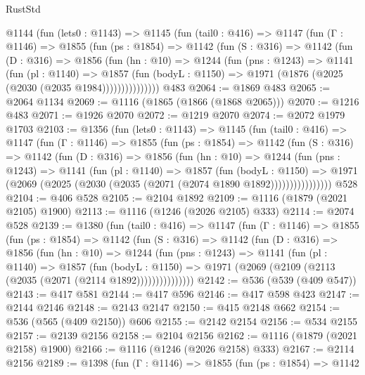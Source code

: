 \begin{lexlean}{RustStd}
\begin{coremodule}
    @1144
      (fun (lets0 : @1143) =>
      @1145
        (fun (tail0 : @416) =>
        @1147
          (fun (Γ : @1146) =>
          @1855
            (fun (ps : @1854) =>
            @1142
              (fun (S : @316) =>
              @1142
                (fun (D : @316) =>
                @1856
                  (fun (hn : @10) =>
                  @1244
                    (fun (pns : @1243) =>
                    @1141
                      (fun (pl : @1140) =>
                      @1857
                        (fun (bodyL : @1150) =>
                        @1971 (@1876 (@2025 (@2030 (@2035 @1984)))))))))))))))
    @483
@2064 := @1869 @483
@2065 := @2064 @1134
@2069 := @1116 (@1865 (@1866 (@1868 @2065)))
@2070 := @1216 @483
@2071 := @1926 @2070
@2072 := @1219 @2070
@2074 := @2072 @1979 @1703
@2103 := @1356
    (fun (lets0 : @1143) =>
    @1145
      (fun (tail0 : @416) =>
      @1147
        (fun (Γ : @1146) =>
        @1855
          (fun (ps : @1854) =>
          @1142
            (fun (S : @316) =>
            @1142
              (fun (D : @316) =>
              @1856
                (fun (hn : @10) =>
                @1244
                  (fun (pns : @1243) =>
                  @1141
                    (fun (pl : @1140) =>
                    @1857
                      (fun (bodyL : @1150) =>
                      @1971 (@2069 (@2025 (@2030 (@2035 (@2071 (@2074 @1890 @1892))))))))))))))))
    @528
@2104 := @406 @528
@2105 := @2104 @1892
@2109 := @1116 (@1879 (@2021 @2105) @1900)
@2113 := @1116 (@1246 (@2026 @2105) @333)
@2114 := @2074 @528
@2139 := @1380
    (fun (tail0 : @416) =>
    @1147
      (fun (Γ : @1146) =>
      @1855
        (fun (ps : @1854) =>
        @1142
          (fun (S : @316) =>
          @1142
            (fun (D : @316) =>
            @1856
              (fun (hn : @10) =>
              @1244
                (fun (pns : @1243) =>
                @1141
                  (fun (pl : @1140) =>
                  @1857
                    (fun (bodyL : @1150) =>
                    @1971 (@2069 (@2109 (@2113 (@2035 (@2071 (@2114 @1892)))))))))))))))
@2142 := @536 (@539 (@409 @547))
@2143 := @417 @581
@2144 := @417 @596
@2146 := @417 @598 @423
@2147 := @2144 @2146
@2148 := @2143 @2147
@2150 := @415 @2148 @662
@2154 := @536 (@565 (@409 @2150)) @606
@2155 := @2142 @2154
@2156 := @534 @2155
@2157 := @2139 @2156
@2158 := @2104 @2156
@2162 := @1116 (@1879 (@2021 @2158) @1900)
@2166 := @1116 (@1246 (@2026 @2158) @333)
@2167 := @2114 @2156
@2189 := @1398
    (fun (Γ : @1146) =>
    @1855
      (fun (ps : @1854) =>
      @1142

\end{coremodule}
\end{lexlean}
